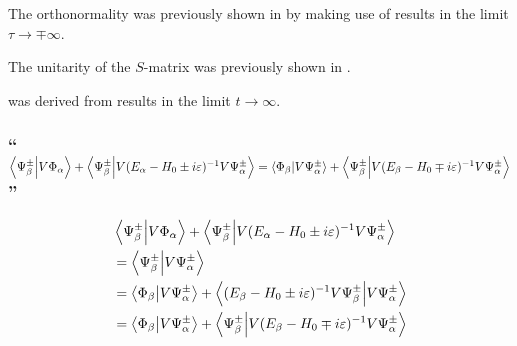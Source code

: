 The orthonormality was previously shown in  by making use of results in the limit $\tau\rightarrow \mp\infty$.

The unitarity of the $S$-matrix was previously shown in .

 was derived from results in the limit $t\rightarrow\infty$.


\subsubsection{\enquote{$\braket{\Psi_\beta^\pm}{V\Phi_\alpha}+\braket{\Psi_\beta^\pm}{V(E_\alpha-H_0\pm i \varepsilon)^{-1}V\Psi_\alpha^\pm}=\braket{\Phi_\beta}{V\Psi_\alpha^\pm}+\braket{\Psi_\beta^\pm}{V(E_\beta-H_0\mp i \varepsilon)^{-1}V\Psi_\alpha^\pm}$} }\label{sususec:3_2_p116_2}
\begin{align*}
	&\braket{\Psi_\beta^\pm}{V\Phi_\alpha}+\braket{\Psi_\beta^\pm}{V(E_\alpha-H_0\pm i \varepsilon)^{-1}V\Psi_\alpha^\pm}\\
	&=\braket{\Psi_\beta^\pm}{V\Psi_\alpha^\pm}\\
	&=\braket{\Phi_\beta}{V\Psi_\alpha^\pm}+\braket{(E_\beta-H_0\pm i \varepsilon)^{-1}V\Psi_\beta^\pm}{V\Psi_\alpha^\pm}\\
	&=\braket{\Phi_\beta}{V\Psi_\alpha^\pm}+\braket{\Psi_\beta^\pm}{V(E_\beta-H_0\mp i \varepsilon)^{-1}V\Psi_\alpha^\pm}
\end{align*}


